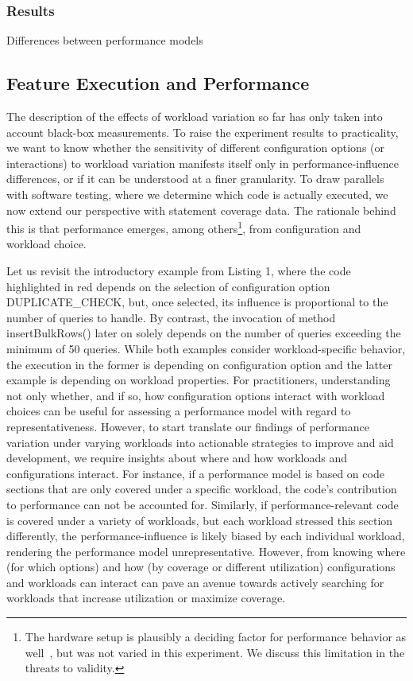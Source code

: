 \subsubsection{Results} {\color{red} Differences between performance models}

\subsection{Feature Execution and Performance}
The description of the effects of workload variation so far has only taken into account black-box measurements. To raise the experiment results to practicality, we want to know whether the sensitivity of different configuration options (or interactions) to workload variation manifests itself only in performance-influence differences, or if it can be understood at a finer granularity. To draw parallels with software testing, where we determine which code is actually executed, we now extend our perspective with statement coverage data. The rationale behind this is that performance emerges, among others\footnote{The hardware setup is plausibly a deciding factor for performance behavior as well~\cite{jamishidi_transfer_2017}, but was not varied in this experiment. We discuss this limitation in the threats to validity.}, from configuration and workload choice.

Let us revisit the introductory example from Listing 1, where the code highlighted in red depends on the selection of configuration option DUPLICATE\_CHECK, but, once selected, its influence is proportional to the number of queries to handle. By contrast, the invocation of method insertBulkRows() later on solely depends on the number of queries exceeding the minimum of 50 queries. While both examples consider workload-specific behavior, the execution in the former is depending on configuration option and the latter example is depending on workload properties. 
For practitioners, understanding not only whether, and if so, how configuration options interact with workload choices can be useful for assessing a performance model with regard to representativeness. However, to start translate our findings of performance variation under varying workloads into actionable strategies to improve and aid development, we require insights about where and how workloads and configurations interact. For instance, if a performance model is based on code sections that are only covered under a specific workload, the code’s contribution to performance can not be accounted for. Similarly, if performance-relevant code is covered under a variety of workloads, but each workload stressed this section differently, the performance-influence is likely biased by each individual workload, rendering the performance model unrepresentative. However, from knowing where (for which options) and how (by coverage or different utilization) configurations and workloads can interact can pave an avenue towards actively searching for workloads that increase utilization or maximize coverage.

